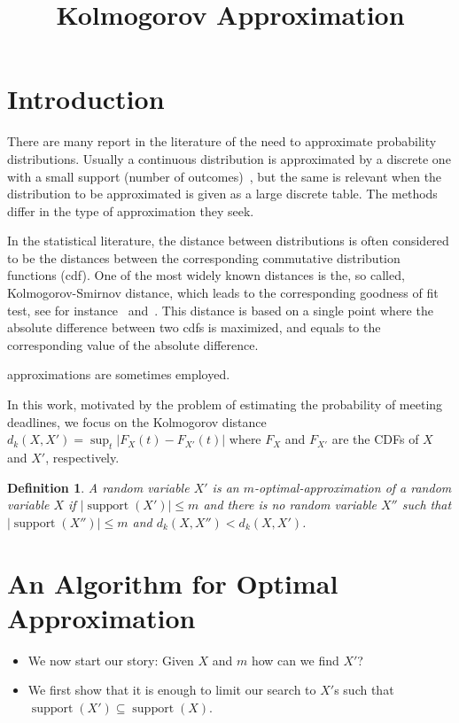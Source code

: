 \documentclass{article}
\title{Kolmogorov Approximation}
\newtheorem{definition}[thm]{Definition}
\DeclareMathOperator{\support}{support}
\begin{document}

\maketitle

\section{Introduction}

There are many report in the literature of the need to approximate probability distributions. Usually a continuous distribution is approximated by a discrete one with a small support (number of outcomes)~\cite{}, but the same is relevant when the distribution to be approximated is given as a large discrete table. The methods differ in the type of approximation they seek.

In the statistical literature, the distance between distributions is often considered to be the distances between the corresponding commutative distribution functions (cdf). One of
the most widely known distances is the, so called, Kolmogorov-Smirnov distance, which leads to the corresponding goodness of fit test, see for instance~\cite{Gibbons and Chakraborti (2011)} and~\cite{Feller (1948)}. This distance is based on a single point where the absolute difference between two cdfs is maximized, and equals to the corresponding value of the absolute difference.


approximations are sometimes employed.

In this work, motivated by the problem of estimating the probability of meeting deadlines, we focus on the Kolmogorov distance $d_k(X,X')= \sup_t |F_X(t) - F_{X'}(t)|$ where $F_X$ and $F_{X'}$ are the CDFs of $X$ and $X'$, respectively.


\begin{definition}
	A random variable $X'$ is an $m$-optimal-approximation of a random variable $X$ if $|\support(X')| \leq m$ and there is no random variable $X''$ such that $|\support(X'')| \leq m$ and $d_k(X,X'') < d_k(X,X')$.
\end{definition}


\section{An Algorithm for Optimal Approximation}


\begin{itemize}
	\item We now start our story: Given $X$ and $m$ how can we find $X'$?
	\item We first show that it is enough to limit our search to $X'$s such that $\support(X') \subseteq \support(X)$.
\end{itemize}
\end{document}
